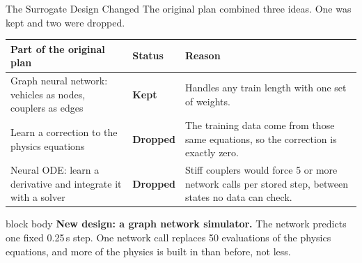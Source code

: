\documentclass[aspectratio=169,11pt]{beamer}
\begin{document}
\begin{frame}{The Surrogate Design Changed}
  \vspace{0.3em}
  {\small The original plan combined three ideas. One was kept and two were dropped.}

  \vspace{0.6em}
  {\footnotesize
  \begin{tabular}{@{}L{4.2cm}L{1.8cm}L{7.4cm}@{}}
    \toprule
    \textbf{Part of the original plan} & \textbf{Status} & \textbf{Reason} \\
    \midrule
    Graph neural network: vehicles as nodes, couplers as edges
      & \textcolor{chartBlue}{\textbf{Kept}}
      & Handles any train length with one set of weights. \\[0.35em]
    Learn a correction to the physics equations
      & \textcolor{uniCrimson}{\textbf{Dropped}}
      & The training data come from those same equations, so the correction
        is exactly zero. \\[0.35em]
    Neural ODE: learn a derivative and integrate it with a solver
      & \textcolor{uniCrimson}{\textbf{Dropped}}
      & Stiff couplers would force 5 or more network calls per stored step,
        between states no data can check. \\
    \bottomrule
  \end{tabular}}

  \vspace{0.9em}
  \begin{beamercolorbox}[wd=\textwidth,sep=7pt]{block body}
    \small\textbf{New design: a graph network simulator.} The network predicts one
    fixed 0.25\,s step. One network call replaces 50 evaluations of the physics
    equations, and more of the physics is built in than before, not less.
  \end{beamercolorbox}
\end{frame}
\end{document}
